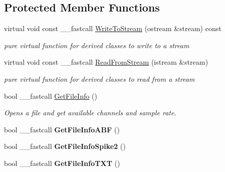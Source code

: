 \subsection*{Protected Member Functions}
\begin{DoxyCompactItemize}
\item 
\hypertarget{class_t_playback_waveform_a6f0b616de0f97ac7f80ad48525e54a37}{virtual void const \+\_\+\+\_\+fastcall \hyperlink{class_t_playback_waveform_a6f0b616de0f97ac7f80ad48525e54a37}{Write\+To\+Stream} (ostream \&stream) const }\label{class_t_playback_waveform_a6f0b616de0f97ac7f80ad48525e54a37}

\begin{DoxyCompactList}\small\item\em pure virtual function for derived classes to write to a stream \end{DoxyCompactList}\item 
\hypertarget{class_t_playback_waveform_a8ce9222064814e1b23ebd21de82cc954}{virtual void const \+\_\+\+\_\+fastcall \hyperlink{class_t_playback_waveform_a8ce9222064814e1b23ebd21de82cc954}{Read\+From\+Stream} (istream \&stream)}\label{class_t_playback_waveform_a8ce9222064814e1b23ebd21de82cc954}

\begin{DoxyCompactList}\small\item\em pure virtual function for derived classes to read from a stream \end{DoxyCompactList}\item 
bool \+\_\+\+\_\+fastcall \hyperlink{class_t_playback_waveform_a1ed2634cdd5bf2370264547b7ee3a418}{Get\+File\+Info} ()
\begin{DoxyCompactList}\small\item\em Opens a file and get available channels and sample rate. \end{DoxyCompactList}\item 
\hypertarget{class_t_playback_waveform_a5465ca76a723e65f75cb1aed51d98ca5}{bool \+\_\+\+\_\+fastcall {\bfseries Get\+File\+Info\+A\+B\+F} ()}\label{class_t_playback_waveform_a5465ca76a723e65f75cb1aed51d98ca5}

\item 
\hypertarget{class_t_playback_waveform_a9ecf34487481726e165425ce08abc17b}{bool \+\_\+\+\_\+fastcall {\bfseries Get\+File\+Info\+Spike2} ()}\label{class_t_playback_waveform_a9ecf34487481726e165425ce08abc17b}

\item 
\hypertarget{class_t_playback_waveform_ae3b16998b0e8ff6da84c4c8765682128}{bool \+\_\+\+\_\+fastcall {\bfseries Get\+File\+Info\+T\+X\+T} ()}\label{class_t_playback_waveform_ae3b16998b0e8ff6da84c4c8765682128}


\end{DoxyCompactItemize}
